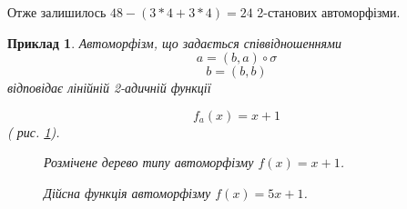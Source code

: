 \documentclass[a4paper,12pt]{article} \usepackage{a4wide}
\numberwithin{equation}{subsection}
\newtheorem{example}{Приклад}[subsection]
\begin{document}
Отже залишилось $48 - (3*4 + 3*4) = 24$ 2-станових автоморфізми.
\begin{example}
Автоморфізм, що задається співвідношеннями
$$a = (b,a)\circ \sigma$$
$$b = (b,b)$$
відповідає лінійній 2-адичній функції

$$f_a(x) = x+1 $$
( рис. \ref{marked_type_tree_xp1}).
\begin{figure}[h!]
\caption{Розмічене дерево типу автоморфізму $f(x)=x+1$.}
\label{marked_type_tree_xp1}
\end{figure}

 \begin{figure}[h!]
\caption{Дійсна функція автоморфізму $f(x)=5x+1$.}
\end{figure}



\end{example}
\end{document}
